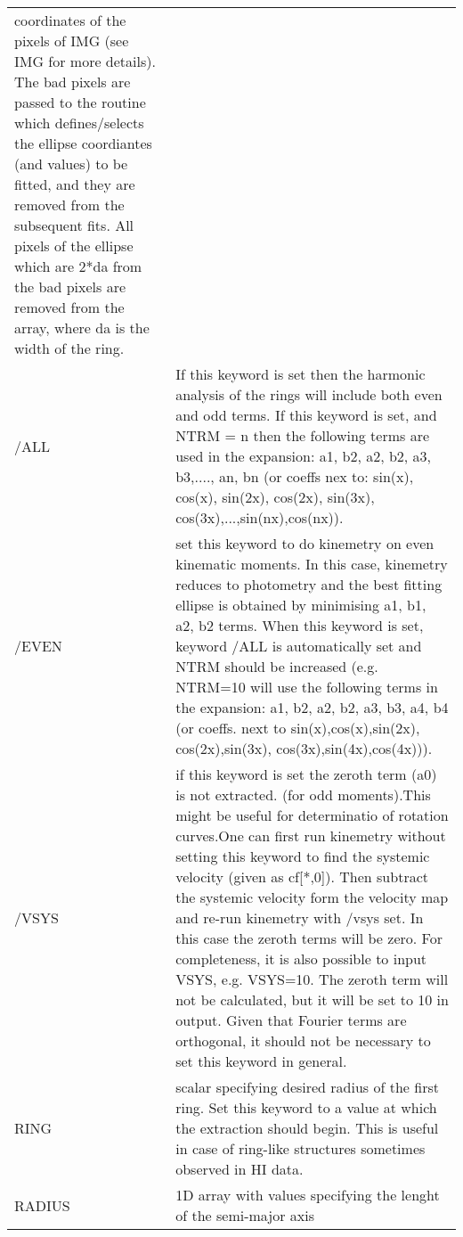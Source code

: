 \begin{center}
\begin{longtable}{p{2.7cm}| p{11.1cm}}
            coordinates of the pixels of IMG (see IMG for more details). 
            The bad pixels are passed to the routine which defines/selects
            the ellipse coordiantes (and values) to be fitted, and they are 
            removed from the subsequent fits. All pixels of
            the ellipse which are 2*da from the bad pixels are removed 
            from the array, where da is the width of the ring. \\ 
%
/ALL & If this keyword is set then the harmonic analysis of the rings 
	           will include both even and odd terms. If this keyword is set,
	           and NTRM = n then the following terms are used in the expansion:
	           a1, b2, a2, b2, a3, b3,...., an, bn (or coeffs nex to: sin(x),
	           cos(x), sin(2x), cos(2x), sin(3x), cos(3x),...,sin(nx),cos(nx)).\\
%
/EVEN & set this keyword to do kinemetry on even kinematic moments. 
	           In this case, kinemetry reduces to photometry and the best
	           fitting ellipse is obtained by minimising a1, b1, a2, b2
	           terms. When this keyword is set, keyword /ALL is automatically
	           set and NTRM should be increased (e.g. NTRM=10 will use the 
	           following terms in the expansion: a1, b2, a2, b2, a3, b3, a4, b4
	           (or coeffs. next to sin(x),cos(x),sin(2x), cos(2x),sin(3x),
	           cos(3x),sin(4x),cos(4x))).\\
%
/VSYS & if this keyword is set the zeroth term (a0) is not extracted.
	           (for odd moments).This might be useful for determinatio of
	           rotation curves.One can first run kinemetry without setting 
	           this keyword to find the systemic velocity (given as cf[*,0]). 
                   Then subtract the systemic velocity form the velocity map and 
	           re-run kinemetry with /vsys set. In this case the zeroth terms 
	           will be zero. For completeness, it is also possible to input 
	           VSYS, e.g. VSYS=10. The zeroth term will not be calculated, 
	           but it will be set to 10 in output. Given that Fourier terms
	           are orthogonal, it should not be necessary to set this keyword
	           in general.\\ 
%
RING & scalar specifying desired radius of the first ring. Set this
	           keyword to a value at which the extraction should begin. This 
	           is useful in case of ring-like structures sometimes observed in 
	           HI data.\\
%   
RADIUS & 1D array with values specifying the lenght of the semi-major axis

\end{longtable}
\end{center}
